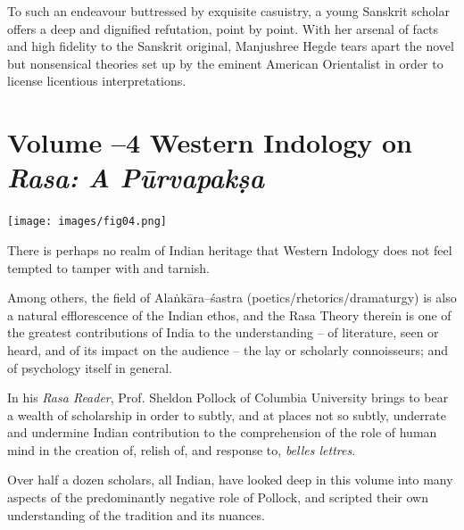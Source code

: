 To such an endeavour buttressed by exquisite casuistry, a young Sanskrit scholar offers a deep and dignified refutation, point by point. With her arsenal of facts and high fidelity to the Sanskrit original, Manjushree Hegde tears apart the novel but nonsensical theories set up by the eminent American Orientalist in order to license licentious interpretations.


\section*{\num{Volume –4} Western Indology on \textit{Rasa: A Pūrvapakṣa}}

\texttt{[image: images/fig04.png]}

There is perhaps no realm of Indian heritage that Western Indology does not feel tempted to tamper with and tarnish.

Among others, the field of Alaṅkāra–śastra (poetics/rhetorics/dramaturgy) is also a natural efflorescence of the Indian ethos, and the Rasa Theory therein is one of the greatest contributions of India to the understanding – of literature, seen or heard, and of its impact on the audience – the lay or scholarly connoisseurs; and of psychology itself in general.

In his \textit{Rasa Reader}, Prof. Sheldon Pollock of Columbia University brings to bear a wealth of scholarship in order to subtly, and at places not so subtly, underrate and undermine Indian contribution to the comprehension of the role of human mind in the creation of, relish of, and response to, \textit{belles lettres}.

Over half a dozen scholars, all Indian, have looked deep in this volume into many aspects of the predominantly negative role of Pollock, and scripted their own understanding of the tradition and its nuances.

